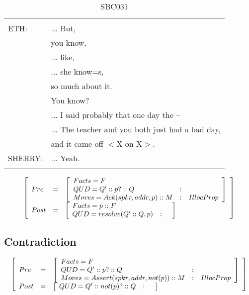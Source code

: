 \documentclass[11pt]{article}
\newenvironment{sbcquote}[2]
{
	\def\savedcaption{\caption{#1}}%
	\def\savedlabel{\label{#2}}%
	\begin{table}[h]
		\centering
		\begin{small}
		\begin{tabular}{ll}
			\hline
			& \\
}
{
	& \\
	\hline
	\end{tabular}
	\end{small}
	\savedcaption
	\savedlabel
\end{table}
}
\newenvironment{recenv}
{\left[\begin{array}{lll}}
{\end{array}\right]}
\begin{document}
			\begin{sbcquote}{SBC031}
				BETH:&	... But,\\
				&you know,\\
				&... like,\\
				&... she know=s,\\
				&so much about it.\\
				&You know?\\
				&... I said probably that one day the --\\
				&... The teacher and you both just had a bad day,\\
				&and it came off $<$X on X$>$.\\
				SHERRY:&	... Yeah.\\
			\end{sbcquote}
			\begin{equation*}
			\begin{recenv}
			Pre  &=& \begin{recenv}
			Facts = F\\
			QUD = Q' :: p? :: Q &:& \\
			Moves = Ack(spkr, addr, p) :: M &:& IllocProp
			\end{recenv}\\
			Post &=& \begin{recenv}
			Facts = p :: F\\
			QUD = resolve(Q' :: Q, p) &:& 
			\end{recenv}
			\end{recenv}
			\end{equation*}
		\subsection{Contradiction} \label{contradiction}
			\begin{equation*}
			\begin{recenv}
			Pre  &=& \begin{recenv}
			Facts = F\\
			QUD = Q' :: p? :: Q &:& \\
			Moves = Assert(spkr, addr, not(p)) :: M &:& IllocProp
			\end{recenv}\\
			Post &=& \begin{recenv}
			QUD = Q' :: not(p)? :: Q &:& 
			\end{recenv}
			\end{recenv}
			\end{equation*}
			
\end{document}
